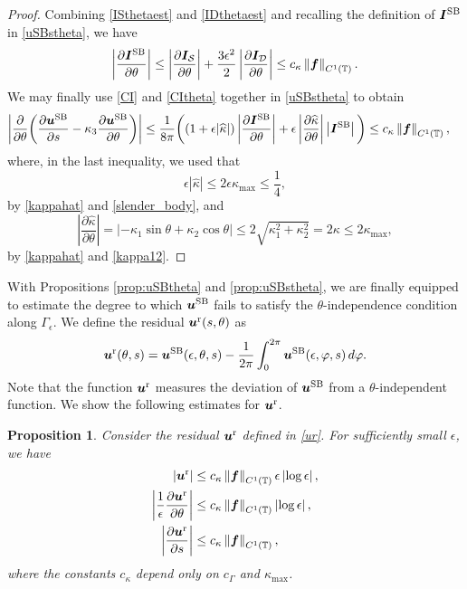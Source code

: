 \documentclass[11pt]{article}
\numberwithin{equation}{section}
\newcommand{\T}{\mathbb{T}}
\newcommand{\bu}{\bm{u}}
\newcommand{\p}{\partial}
\newcommand{\ts}{\thinspace}
\newcommand{\SB}{{\rm SB}}
\newcommand{\abs}[1]{\left\lvert #1 \right\rvert}
\newcommand{\norm}[1]{\left\lVert #1 \right\rVert}
\newcommand{\wh}[1]{\widehat{#1}}
\newcommand{\mc}[1]{\mathcal{#1}}
\newtheorem{proposition}[theorem]{Proposition}
\theoremstyle{definition}
\begin{document}
\begin{proof}
Combining \eqref{ISthetaest} and \eqref{IDthetaest} and recalling the definition of $\bm{I}^{\SB}$ in \eqref{uSBstheta}, we have
\begin{equation}\label{CItheta}
\abs{\frac{\p \bm{I}^{\SB}}{\p \theta}}\le \abs{\frac{\p \bm{I}_{\mc S}}{\p \theta}} +\frac{3\epsilon^2}{2}\abs{\frac{\p \bm{I}_{\mc D}}{\p\theta}} \le c_\kappa \norm{\bm{f}}_{C^1(\T)}.
\end{equation}
We may finally use \eqref{CI} and \eqref{CItheta} together in \eqref{uSBstheta} to obtain
\begin{equation}\label{mixed_est}
\begin{split}
\abs{\frac{\p}{\p \theta}\bigg(\frac{\p \bu^{\SB}}{\p s}-\kappa_3\frac{\p \bu^{\SB}}{\p \theta} \bigg) }
&\le \frac{1}{8\pi}\bigg((1+\epsilon|\wh\kappa|)\abs{\frac{\p \bm{I}^{\SB}}{\p \theta}}+\epsilon\abs{\frac{\p \wh{\kappa}}{\p \theta}}\abs{\bm{I}^{\SB}} \bigg) \le c_\kappa \norm{\bm{f}}_{C^1(\T)},
\end{split}
\end{equation}
where, in the last inequality, we used that
\[ \epsilon\abs{\wh\kappa}\le 2\epsilon\kappa_{\max} \le \frac{1}{4}, \]
by \eqref{kappahat} and \eqref{slender_body}, and
\[\abs{\frac{\p \wh{\kappa}}{\p \theta}} = \abs{-\kappa_1\sin \theta+\kappa_2\cos\theta} \le 2\sqrt{\kappa_1^2+\kappa_2^2} = 2\kappa\le  2\kappa_{\max}, \]
by \eqref{kappahat} and \eqref{kappa12}. 
\end{proof}

With Propositions \ref{prop:uSBtheta} and \ref{prop:uSBstheta}, we are finally equipped to estimate the degree to which $\bu^{\SB}$ fails to satisfy the $\theta$-independence condition along $\Gamma_{\epsilon}$. We define the residual $\bu^{\rm r}(s,\theta)$ as 
\begin{equation}\label{ur}
\bu^{\rm r}(\theta,s) = \bu^{\rm SB}(\epsilon,\theta,s) - \frac{1}{2\pi}\int_0^{2\pi} \bu^{\SB}(\epsilon,\varphi,s) \ts d\varphi.
\end{equation}
Note that the function $\bu^{\rm r}$ measures the deviation of $\bu^{\SB}$ from a $\theta$-independent function. We show the following estimates for $\bu^{\rm r}$.
\begin{proposition}\label{ur_and_derivs}
Consider the residual $\bu^{\rm r}$ defined in \eqref{ur}. For sufficiently small $\epsilon$, we have 
\begin{align}
\label{urest}
\abs{\bu^{\rm r}}&\le c_\kappa \norm{\bm{f}}_{C^1(\T)}\epsilon\abs{\log\epsilon},\\
\label{urtheta}
\abs{\frac{1}{\epsilon}\frac{\p \bu^{\rm r}}{\p \theta}}&\le c_\kappa \norm{\bm{f}}_{C^1(\T)}\abs{\log\epsilon},\\
\label{urs}
\abs{\frac{\p \bu^{\rm r}}{\p s}}&\le c_\kappa \norm{\bm{f}}_{C^1(\T)},
\end{align}
where the constants $c_\kappa$ depend only on $c_\Gamma$ and $\kappa_{\max}$.
\end{proposition}
\end{document}
